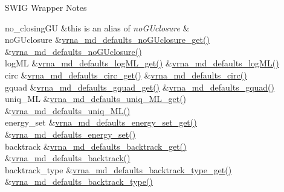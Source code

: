 \begin{DoxyRefDesc}{S\+W\+I\+G Wrapper Notes}
\begin{longtabu}
no\+\_\+closing\+GU  &this is an alias of {\itshape no\+G\+Uclosure}  &\\
no\+G\+Uclosure  &\mbox{\hyperlink{group__model__details_ga4f7fdad083243a5348d63320ddaa70f3}{vrna\+\_\+md\+\_\+defaults\+\_\+no\+G\+Uclosure\+\_\+get()}}  &\mbox{\hyperlink{group__model__details_gade5b9951d71ca2fb357a4e6c0c18ccd1}{vrna\+\_\+md\+\_\+defaults\+\_\+no\+G\+Uclosure()}}   \\
log\+ML  &\mbox{\hyperlink{group__model__details_ga93f04e070d529c5d0bb87c9681f6ad29}{vrna\+\_\+md\+\_\+defaults\+\_\+log\+M\+L\+\_\+get()}}  &\mbox{\hyperlink{group__model__details_ga3de50a73455d88c3957386933b8e1f90}{vrna\+\_\+md\+\_\+defaults\+\_\+log\+M\+L()}}   \\
circ  &\mbox{\hyperlink{group__model__details_gad3a7e58de344ad93a08925f58f94f6fb}{vrna\+\_\+md\+\_\+defaults\+\_\+circ\+\_\+get()}}  &\mbox{\hyperlink{group__model__details_ga4e1deb3e91a8a99e5c6dd905a5eb0186}{vrna\+\_\+md\+\_\+defaults\+\_\+circ()}}   \\
gquad  &\mbox{\hyperlink{group__model__details_gae645b8612f879eb38b45244fa9eddb9e}{vrna\+\_\+md\+\_\+defaults\+\_\+gquad\+\_\+get()}}  &\mbox{\hyperlink{group__model__details_ga0685ca2aeb39af76f2421fc308163dce}{vrna\+\_\+md\+\_\+defaults\+\_\+gquad()}}   \\
uniq\+\_\+\+ML  &\mbox{\hyperlink{group__model__details_gab48e70fd024bf838404bcbcca0c874a0}{vrna\+\_\+md\+\_\+defaults\+\_\+uniq\+\_\+\+M\+L\+\_\+get()}}  &\mbox{\hyperlink{group__model__details_ga59b944f61c5d2babec2d4c48c820de67}{vrna\+\_\+md\+\_\+defaults\+\_\+uniq\+\_\+\+M\+L()}}   \\
energy\+\_\+set  &\mbox{\hyperlink{group__model__details_ga017ed6afb1cba2b7f242412cab618b53}{vrna\+\_\+md\+\_\+defaults\+\_\+energy\+\_\+set\+\_\+get()}}  &\mbox{\hyperlink{group__model__details_ga8dd29c55787a4576277e1907e92d810c}{vrna\+\_\+md\+\_\+defaults\+\_\+energy\+\_\+set()}}   \\
backtrack  &\mbox{\hyperlink{group__model__details_ga90da1156e6883ddd68527c2830706648}{vrna\+\_\+md\+\_\+defaults\+\_\+backtrack\+\_\+get()}}  &\mbox{\hyperlink{group__model__details_ga978c468b2fe96a70d5191e3dd17d5599}{vrna\+\_\+md\+\_\+defaults\+\_\+backtrack()}}   \\
backtrack\+\_\+type  &\mbox{\hyperlink{group__model__details_ga1425b4ebd0e034dead66d79becd64143}{vrna\+\_\+md\+\_\+defaults\+\_\+backtrack\+\_\+type\+\_\+get()}}  &\mbox{\hyperlink{group__model__details_ga68305274de96b56b7799575e222560d8}{vrna\+\_\+md\+\_\+defaults\+\_\+backtrack\+\_\+type()}}   \\

\end{longtabu}
\end{DoxyRefDesc}
